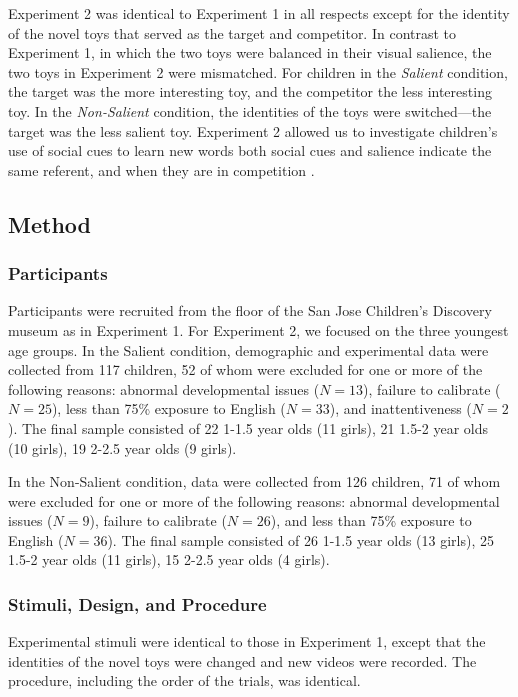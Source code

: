 \documentclass[man,floatsintext]{apa6}
\begin{document}
Experiment 2 was identical to Experiment 1 in all respects except for the identity of the novel toys that served as the target and competitor. In contrast to Experiment 1, in which the two toys were balanced in their visual salience, the two toys in Experiment 2 were mismatched. For children in the \emph{Salient} condition, the target was the more interesting toy, and the competitor the less interesting toy. In the \emph{Non-Salient} condition, the identities of the toys were switched---the target was the less salient toy. Experiment 2 allowed us to investigate children's use of social cues to learn new words both social cues and salience indicate the same referent, and when they are in competition \cite<as in>{Hollich2000,Pruden2006}.

\subsection{Method}

\subsubsection{Participants}

Participants were recruited from the floor of the San Jose Children's Discovery museum as in Experiment 1. For Experiment 2, we focused on the three youngest age groups. In the Salient condition, demographic and experimental data were collected from 117 children, 52 of whom were excluded for one or more of the following reasons: abnormal developmental issues ($N= 13$), failure to calibrate ($N=25$), less than 75\% exposure to English ($N=33$), and inattentiveness ($N=2$). The final sample consisted of 22 1-1.5 year olds (11 girls), 21 1.5-2 year olds (10 girls), 19 2-2.5 year olds (9 girls). 

In the Non-Salient condition, data were collected from 126 children, 71 of whom were excluded for one or more of the following reasons: abnormal developmental issues ($N= 9$), failure to calibrate ($N=26$), and less than 75\% exposure to English ($N=36$). The final sample consisted of 26 1-1.5 year olds (13 girls), 25 1.5-2 year olds (11 girls), 15 2-2.5 year olds (4 girls).

\subsubsection{Stimuli, Design, and Procedure}

Experimental stimuli were identical to those in Experiment 1, except that the identities of the novel toys were changed and new videos were recorded. The procedure, including the order of the trials, was identical.
\end{document}
